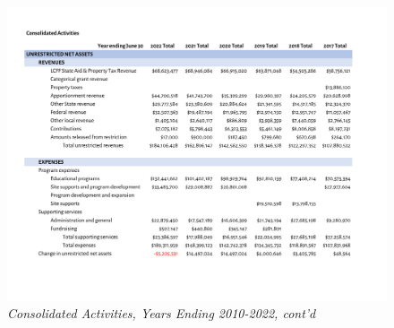 \begin{figure}
  \caption*{\textit{Consolidated Activities, Years Ending 2010-2022, cont'd}} %
  \includegraphics[page=3,width=0.9\textheight]{Consolidated_Activities_Years_2010-2022} %
\end{figure}

